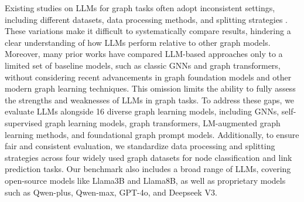
Existing studies on LLMs for graph tasks often adopt inconsistent settings, including different datasets, data processing methods, and splitting strategies \cite{li2024glbench}. These variations make it difficult to systematically compare results, hindering a clear understanding of how LLMs perform relative to other graph models. Moreover, many prior works \cite{instructglm, tang2024graphgpt} have compared LLM-based approaches only to a limited set of baseline models, such as classic GNNs and graph transformers,  without considering recent advancements in graph foundation models \cite{ofa, huang2024prodigy} and other modern graph learning techniques. This omission limits the ability to fully assess the strengths and weaknesses of LLMs in graph tasks. To address these gaps, we evaluate LLMs alongside 16 diverse graph learning models, including GNNs, self-supervised graph learning models, graph transformers, LM-augmented graph learning methods, and foundational graph prompt models. Additionally, to ensure fair and consistent evaluation, we standardize data processing and splitting strategies across four widely used graph datasets for node classification and link prediction tasks. Our benchmark also includes a broad range of LLMs, covering open-source models like Llama3B and Llama8B, as well as proprietary models such as Qwen-plus, Qwen-max, GPT-4o, and Deepseek V3.


